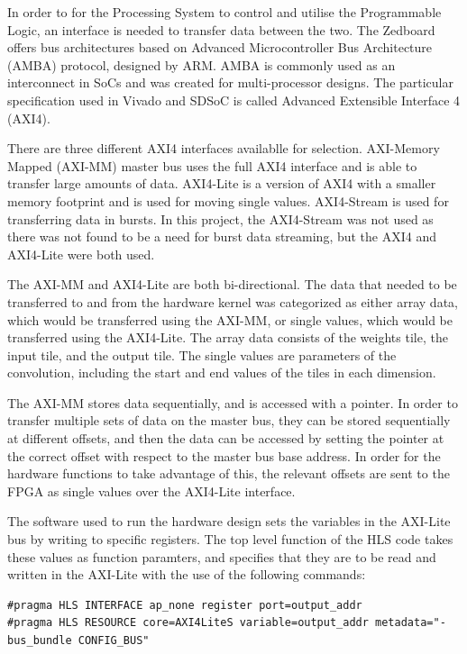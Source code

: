 \documentclass[12pt]{article}
\begin{document}
In order to for the Processing System to control and utilise the Programmable Logic, an interface is needed to transfer data between the two. The Zedboard offers bus architectures based on Advanced Microcontroller Bus Architecture (AMBA) protocol, designed by ARM. AMBA is commonly used as an interconnect in SoCs and was created for multi-processor designs. The particular specification used in Vivado and SDSoC is called Advanced Extensible Interface 4 (AXI4). 

There are three different AXI4 interfaces availablle for selection. AXI-Memory Mapped (AXI-MM) master bus uses the full AXI4 interface and is able to transfer large amounts of data. AXI4-Lite is a version of AXI4 with a smaller memory footprint and is used for moving single values. AXI4-Stream is used for transferring data in bursts. In this project, the AXI4-Stream was not used as there was not found to be a need for burst data streaming, but the AXI4 and AXI4-Lite were both used. 

The AXI-MM and AXI4-Lite are both bi-directional. The data that needed to be transferred to and from the hardware kernel was categorized as either array data, which would be transferred using the AXI-MM, or single values, which would be transferred using the AXI4-Lite. The array data consists of the weights tile, the input tile, and the output tile. The single values are parameters of the convolution, including the start and end values of the tiles in each dimension.

The AXI-MM stores data sequentially, and is accessed with a pointer. In order to transfer multiple sets of data on the master bus, they can be stored sequentially at different offsets, and then the data can be accessed by setting the pointer at the correct offset with respect to the master bus base address. In order for the hardware functions to take advantage of this, the relevant offsets are sent to the FPGA as single values over the AXI4-Lite interface.

The software used to run the hardware design sets the variables in the AXI-Lite bus by writing to specific registers. The top level function of the HLS code takes these values as function paramters, and specifies that they are to be read and written in the AXI-Lite with the use of the following commands:

\begin{lstlisting}[deletekeywords={register}]
#pragma HLS INTERFACE ap_none register port=output_addr
#pragma HLS RESOURCE core=AXI4LiteS variable=output_addr metadata="-bus_bundle CONFIG_BUS"
\end{lstlisting}
\end{document}

